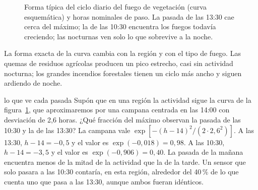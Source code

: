 \begin{figure}[ht]
\centering
{}
\caption{Forma típica del ciclo diario del fuego de vegetación (curva esquemática) y horas
nominales de paso. La pasada de las 13:30 cae cerca del máximo; la de las 10:30 encuentra los
fuegos todavía creciendo; las nocturnas ven solo lo que sobrevive a la noche.}
\label{fig:diurno}
\end{figure}

La forma exacta de la curva cambia con la región y con el tipo de fuego. Las quemas de residuos
agrícolas producen un pico estrecho, casi sin actividad nocturna; los grandes incendios
forestales tienen un ciclo más ancho y siguen ardiendo de noche.

\begin{ejemplo}{lo que ve cada pasada}
Supón que en una región la actividad sigue la curva de la figura~\ref{fig:diurno}, que
aproximaremos por una campana centrada en las 14:00 con desviación de 2,6 horas. ¿Qué fracción
del máximo observan la pasada de las 10:30 y la de las 13:30?
\solucion La campana vale $\exp[-(h-14)^2/(2\cdot 2{,}6^2)]$. A las 13:30, $h - 14 = -0{,}5$ y
el valor es $\exp(-0{,}018) = 0{,}98$. A las 10:30, $h-14 = -3{,}5$ y el valor es
$\exp(-0{,}906) = 0{,}40$. La pasada de la mañana encuentra menos de la mitad de la actividad
que la de la tarde. Un sensor que solo pasara a las 10:30 contaría, en esta región, alrededor
del 40\,{}\% de lo que cuenta uno que pasa a las 13:30, aunque ambos fueran idénticos.
\end{ejemplo}

